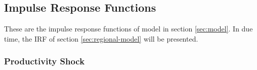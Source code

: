 \documentclass[
thesis.tex
]{subfiles}
\begin{document}
%
%
%
%

	
	
	\subsection{Impulse Response Functions}
	
	These are the impulse response functions of model in section \ref{sec:model}. In due time, the IRF of section \ref{sec:regional-model} will be presented.
	
	\subsubsection{Productivity Shock}
	
\end{document}

